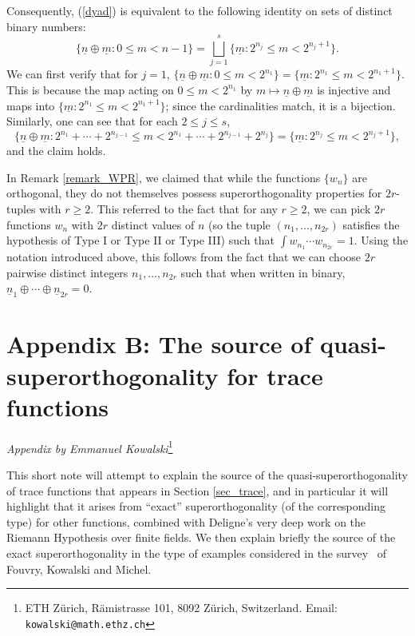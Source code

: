 \documentclass[oneside,11pt]{amsart}
\begin{document}
Consequently, (\ref{dyad}) is equivalent to the following identity on sets of distinct binary numbers:  
\[ \{ \underline{n} \oplus \underline{m} : 0 \leq m < n-1 \} = \bigsqcup_{j=1}^s \{ \underline{m} : 2^{n_j} \leq m < 2^{n_j+1}\}. \]
We can first verify that for $j=1$,
$ \{ \underline{n} \oplus \underline{m} : 0 \leq m < 2^{n_1} \}  = \{ \underline{m} : 2^{n_1} \leq m < 2^{n_1+1}\}.$
This is because the map acting on $ 0 \leq m < 2^{n_1}$    by $m \mapsto  \underline{n} \oplus \underline{m} $ is injective and maps into $\{ \underline{m} : 2^{n_1} \leq m < 2^{n_1+1}\}$; since the cardinalities match, it is a bijection. 
Similarly, one can see that for each $2 \leq j \leq s$,
\[ \{ \underline{n} \oplus \underline{m} : 2^{n_1} + \cdots + 2^{n_{j-1}} \leq m < 2^{n_1} + \cdots + 2^{n_{j-1}} + 2^{n_j} \}  = \{ \underline{m} : 2^{n_j} \leq m < 2^{n_j+1}\},\]
and the claim holds.

In Remark \ref{remark_WPR}, we claimed that while the functions $\{w_n\}$ are orthogonal, they do not themselves possess superorthogonality properties for $2r$-tuples with $r\geq 2$. This referred to the fact that for any $r \geq 2$,  we can pick $2r$ functions $w_n$ with $2r$ distinct values of $n$ (so  the tuple $(n_1,\ldots, n_{2r})$ satisfies the hypothesis of Type I or Type II or Type III)   such that $\int w_{n_1} \cdots w_{n_{2r}} = 1$. Using the notation introduced above, this follows from the fact that we can choose $2r$ pairwise distinct integers $n_1, \ldots, n_{2r}$ such that when written in binary, $\underline{n}_1 \oplus \cdots \oplus \underline{n}_{2r}=0$.
  
  \section*{Appendix B: The source of quasi-superorthogonality for trace functions}
  \begin{center}
\emph{ Appendix by Emmanuel Kowalski}\footnote{ETH Z\"urich, R\"amistrasse 101, 8092 Z\"urich, Switzerland. Email: \tt{kowalski@math.ethz.ch}}
  \end{center}
  
 \setcounter{subsection}{0}
    
  \setcounter{equation}{0}
\renewcommand{\theequation}{B.\arabic{equation}}
This short note will attempt to explain the source of the
quasi-superorthogonality of trace functions that appears in Section \ref{sec_trace},
and in particular it will highlight that it arises from ``exact''
superorthogonality (of the corresponding type) for other functions,
combined with Deligne's very deep work on the Riemann Hypothesis over
finite fields. We then explain briefly the source of the exact
superorthogonality in the type of examples considered in the
survey~\cite{FKM15} of Fouvry, Kowalski and Michel.
\end{document}
